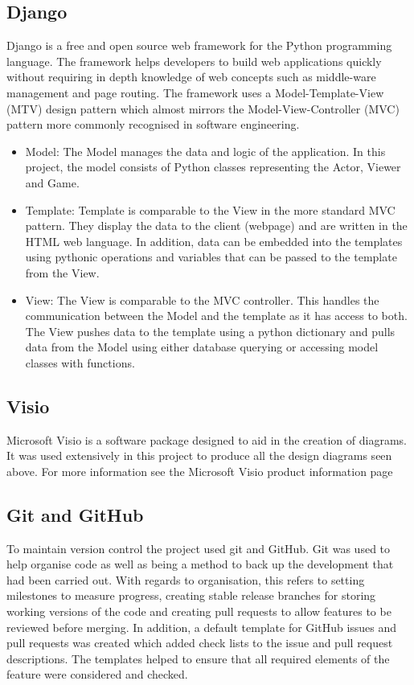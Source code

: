 \subsection{Django}
Django is a free and open source web framework for the Python programming language. The framework helps developers to build web applications quickly without requiring in depth knowledge of web concepts such as middle-ware management and page routing. The framework uses a Model-Template-View (MTV) design pattern which almost mirrors the Model-View-Controller (MVC) pattern more commonly recognised in software engineering. 
\begin{itemize}
	\item Model: The Model manages the data and logic of the application. In this project, the model consists of Python classes representing the Actor, Viewer and Game.
	
	\item Template: Template is comparable to the View in the more standard MVC pattern. They display the data to the client (webpage) and are written in the HTML web language.  In addition, data can be embedded into the templates using pythonic operations and variables that can be passed to the template from the View. 
	
	\item View: The View is comparable to the MVC controller. This handles the communication between the Model and the template as it has access to both. The View pushes data to the template using a python dictionary and pulls data from the Model using either database querying or accessing model classes with functions.
	
\end{itemize}

\subsection{Visio}
Microsoft Visio is a software package designed to aid in the creation of diagrams. It was used extensively in this project to produce all the design diagrams seen above. For more information see the Microsoft Visio product information page \cite{visio}

\subsection{Git and GitHub}
To maintain version control the project used git and GitHub. Git was used to help organise code as well as being a method to back up the development that had been carried out. With regards to organisation, this refers to setting milestones to measure progress, creating stable release branches for storing working versions of the code and creating pull requests to allow features to be reviewed before merging. In addition, a default template for GitHub issues and pull requests was created which added check lists to the issue and pull request descriptions. The templates helped to ensure that all required elements of the feature were considered and checked.

